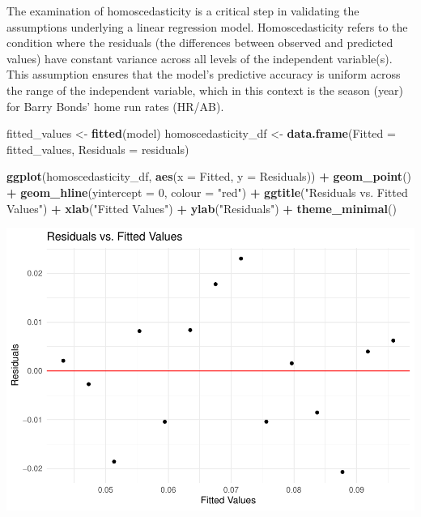 \documentclass[
]{article}
\newenvironment{Shaded}{\begin{snugshade}}{\end{snugshade}}
\newcommand{\AttributeTok}[1]{\textcolor[rgb]{0.13,0.29,0.53}{#1}}
\newcommand{\DecValTok}[1]{\textcolor[rgb]{0.00,0.00,0.81}{#1}}
\newcommand{\FunctionTok}[1]{\textcolor[rgb]{0.13,0.29,0.53}{\textbf{#1}}}
\newcommand{\NormalTok}[1]{#1}
\newcommand{\OtherTok}[1]{\textcolor[rgb]{0.56,0.35,0.01}{#1}}
\newcommand{\SpecialCharTok}[1]{\textcolor[rgb]{0.81,0.36,0.00}{\textbf{#1}}}
\newcommand{\StringTok}[1]{\textcolor[rgb]{0.31,0.60,0.02}{#1}}
\begin{document}
The examination of homoscedasticity is a critical step in validating the
assumptions underlying a linear regression model. Homoscedasticity
refers to the condition where the residuals (the differences between
observed and predicted values) have constant variance across all levels
of the independent variable(s). This assumption ensures that the model's
predictive accuracy is uniform across the range of the independent
variable, which in this context is the season (year) for Barry Bonds'
home run rates (HR/AB).

\begin{Shaded}
\begin{Highlighting}[]
\NormalTok{fitted\_values }\OtherTok{\textless{}{-}} \FunctionTok{fitted}\NormalTok{(model)}
\NormalTok{homoscedasticity\_df }\OtherTok{\textless{}{-}} \FunctionTok{data.frame}\NormalTok{(}\AttributeTok{Fitted =}\NormalTok{ fitted\_values, }\AttributeTok{Residuals =}\NormalTok{ residuals)}

\FunctionTok{ggplot}\NormalTok{(homoscedasticity\_df, }\FunctionTok{aes}\NormalTok{(}\AttributeTok{x =}\NormalTok{ Fitted, }\AttributeTok{y =}\NormalTok{ Residuals)) }\SpecialCharTok{+}
  \FunctionTok{geom\_point}\NormalTok{() }\SpecialCharTok{+}
  \FunctionTok{geom\_hline}\NormalTok{(}\AttributeTok{yintercept =} \DecValTok{0}\NormalTok{, }\AttributeTok{colour =} \StringTok{"red"}\NormalTok{) }\SpecialCharTok{+}
  \FunctionTok{ggtitle}\NormalTok{(}\StringTok{"Residuals vs. Fitted Values"}\NormalTok{) }\SpecialCharTok{+}
  \FunctionTok{xlab}\NormalTok{(}\StringTok{"Fitted Values"}\NormalTok{) }\SpecialCharTok{+}
  \FunctionTok{ylab}\NormalTok{(}\StringTok{"Residuals"}\NormalTok{) }\SpecialCharTok{+}
  \FunctionTok{theme\_minimal}\NormalTok{()}
\end{Highlighting}
\end{Shaded}

\includegraphics{602_project_files/figure-latex/unnamed-chunk-9-1.pdf}
\end{document}
